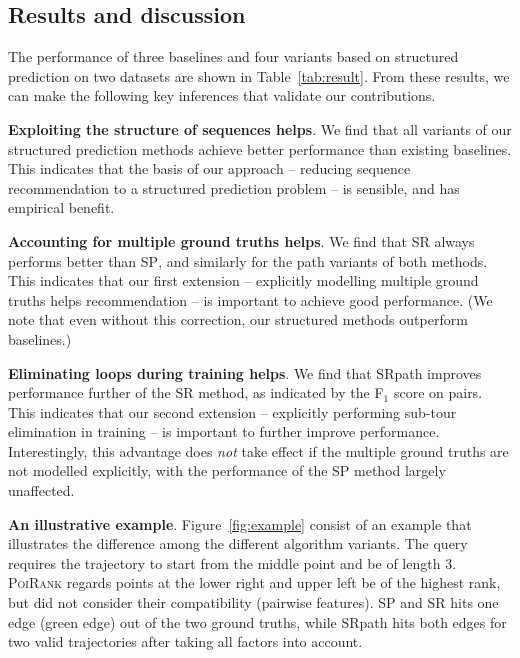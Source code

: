 \secmoveup
\subsection{Results and discussion}
\label{sec:result}
\textmoveup



The performance of three baselines and four variants based on structured prediction on two datasets are shown in Table~\ref{tab:result}.
From these results, we can make the following key inferences that validate our contributions.

\textbf{Exploiting the structure of sequences helps}.
We find that all variants of our structured prediction methods achieve better performance than existing baselines.
This indicates that the basis of our approach -- reducing sequence recommendation to a structured prediction problem -- is sensible, and has empirical benefit.

\textbf{Accounting for multiple ground truths helps}.
We find that \textsc{SR} always performs better than \textsc{SP},
and similarly for the {\sc path} variants of both methods.
This indicates that our first extension -- explicitly modelling multiple ground truths helps recommendation -- is important to achieve good performance.
(We note that even without this correction, our structured methods outperform baselines.)

\textbf{Eliminating loops during training helps}.
We find that {\sc SRpath} improves performance further of the {\sc SR} method,
as indicated by the F$_1$ score on pairs.
This indicates that our second extension -- explicitly performing sub-tour elimination in training -- is important to further improve performance.
Interestingly,
this advantage does \emph{not} take effect if the multiple ground truths are not modelled explicitly,
with the performance of the {\sc SP} method largely unaffected.

\textbf{An illustrative example}. Figure~\ref{fig:example} consist of an example that illustrates the difference among the different algorithm variants. The query requires the trajectory to start from the middle point and be of length 3.
\textsc{PoiRank} regards points at the lower right and upper left be of the highest rank, but did not consider their compatibility (\ie pairwise features). {\sc SP} and {\sc SR} hits one edge (green edge) out of the two ground truths, while {\sc SRpath} hits both edges for two valid trajectories after taking all factors into account.

